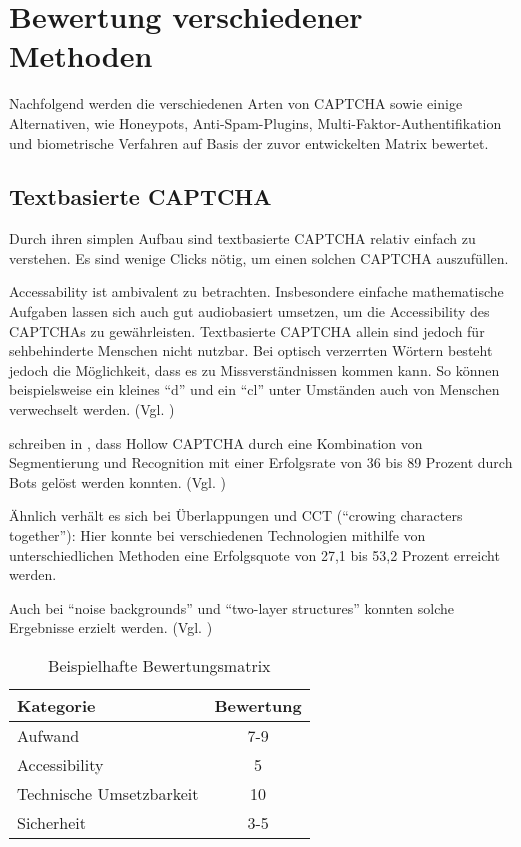 \chapter{Bewertung verschiedener Methoden}

Nachfolgend werden die verschiedenen Arten von CAPTCHA sowie einige Alternativen, wie Honeypots, Anti-Spam-Plugins, 
Multi-Faktor-Authentifikation und biometrische Verfahren auf Basis der zuvor entwickelten Matrix bewertet. 

\section{Textbasierte CAPTCHA}

Durch ihren simplen Aufbau sind textbasierte CAPTCHA relativ einfach zu verstehen.
Es sind wenige Clicks nötig, um einen solchen CAPTCHA auszufüllen. 

Accessability ist ambivalent zu betrachten.
Insbesondere einfache mathematische Aufgaben lassen sich auch gut audiobasiert umsetzen, 
um die Accessibility des CAPTCHAs zu gewährleisten.
Textbasierte CAPTCHA allein sind jedoch für sehbehinderte Menschen nicht nutzbar.
Bei optisch verzerrten Wörtern besteht jedoch die Möglichkeit, dass es zu Missverständnissen kommen kann.
So können beispielsweise ein kleines ``d'' und ein ``cl'' unter Umständen auch von Menschen verwechselt werden. (Vgl. \cite[p.3]{usabilityofcaptchas})

\citeauthor{surveyofresearch} schreiben in \cite[p.xx]{surveyofresearch}, 
dass Hollow CAPTCHA durch eine Kombination von Segmentierung und Recognition %
mit einer Erfolgsrate von 36 bis 89 Prozent durch Bots gelöst werden konnten. (Vgl. \cite[p.76ff]{surveyofresearch}) %

Ähnlich verhält es sich bei Überlappungen und CCT (``crowing characters together''):
Hier konnte bei verschiedenen Technologien mithilfe von unterschiedlichen Methoden
eine Erfolgsquote von 27,1 bis 53,2 Prozent erreicht werden. \cite[p.76]{surveyofresearch} %

Auch bei ``noise backgrounds'' und ``two-layer structures'' konnten solche Ergebnisse erzielt werden. 
(Vgl. \cite[p.76]{surveyofresearch})


\begin{table}[h!]
    \caption{Beispielhafte Bewertungsmatrix}
    \begin{center}
        \begin{tabular}{l|c}
            Kategorie                       & Bewertung \\\hline
            Aufwand                         & 7-9         \\
            Accessibility                   & 5        \\
            Technische Umsetzbarkeit        & 10         \\
            Sicherheit                      & 3-5         
        \end{tabular}
    \end{center}
\end{table}

